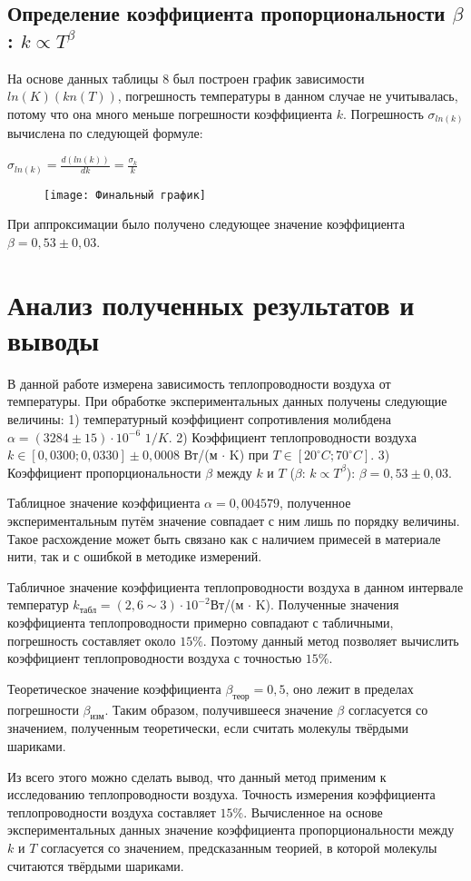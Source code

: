 \documentclass[a4paper,14pt]{article}
\begin{document}
\subsection{Определение коэффициента пропорциональности $\beta$: $k \propto T^{\beta}$}
На основе данных таблицы 8 был построен график зависимости $ln(K)(kn(T))$, погрешность температуры в данном случае не учитывалась, потому что она много меньше погрешности коэффициента $k$. Погрешность $\sigma_{ln(k)}$ вычислена по следующей формуле: \begin{large} $\sigma_{ln(k)} = \frac{d(ln(k))}{dk} = \frac{\sigma_k}{k}$ \end{large}

\begin{center}
\begin{figure}[H]
\texttt{[image: Финальный график]}
\label{1}
\end{figure}
\end{center}

При аппроксимации было получено следующее значение коэффициента $\beta = 0,53 \pm 0,03$.

\section{Анализ полученных результатов и выводы}

В данной работе измерена зависимость теплопроводности воздуха от температуры. При обработке экспериментальных данных получены следующие величины: 1) температурный коэффициент сопротивления молибдена $\alpha = (3284 \pm 15) \cdot 10^{-6}$ $1/K$. 2) Коэффициент теплопроводности воздуха $k \in [0,0300; 0,0330] \pm 0,0008$ Вт/(м $\cdot$ K) при $T \in [20^{\circ}C; 70^{\circ}C]$. 3) Коэффициент пропорциональности $\beta$ между $k$ и $T$ ($\beta$: $k \propto T^{\beta}$): $\beta = 0,53 \pm 0,03$.

Таблицное значение коэффициента $\alpha = 0,004579$, полученное экспериментальным путём значение совпадает с ним лишь по порядку величины. Такое расхождение может быть связано как с наличием примесей в материале нити, так и с ошибкой в методике измерений. 

Табличное значение коэффициента теплопроводности воздуха в данном интервале температур $k_{\text{табл}} = (2,6 \sim 3) \cdot 10^{-2}$Вт/(м $\cdot$ K). Полученные значения коэффициента теплопроводности примерно совпадают с табличными, погрешность составляет около $15 \%$. Поэтому данный метод позволяет вычислить коэффициент теплопроводности воздуха с точностью $15 \%$. 

Теоретическое значение коэффициента $\beta_{\text{теор}} = 0,5$, оно лежит в пределах погрешности $\beta_{\text{изм}}$. Таким образом, получившееся значение $\beta$ согласуется со значением, полученным теоретически, если считать молекулы твёрдыми шариками.

Из всего этого можно сделать вывод, что данный метод применим к исследованию теплопроводности воздуха. Точность измерения коэффициента теплопроводности воздуха составляет $15 \%$. Вычисленное на основе экспериментальных данных значение коэффициента пропорциональности между $k$ и $T$ согласуется со значением, предсказанным теорией, в которой молекулы считаются твёрдыми шариками.
\end{document}
